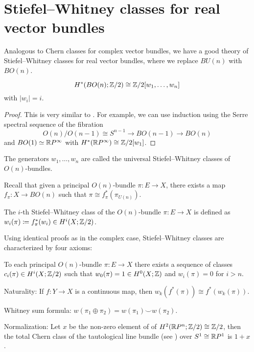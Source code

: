 \documentclass[ma3408.tex]{subfiles}
\begin{document}
\section{Stiefel--Whitney classes for real vector bundles}
Analogous to Chern classes for complex vector bundles, we have a good theory of Stiefel--Whitney classes for real vector bundles, where we replace $BU(n)$ with $BO(n)$. 
\begin{Prop}\label{prop:cohomology-of-bon}
\[
H^*(BO(n);\mathbb{Z}/2) \cong \mathbb{Z}/2[w_1,\ldots,w_n]
\]
with $|w_i| = i$. 
\end{Prop}
\begin{proof}
This is very similar to . For example, we can use induction using the Serre spectral sequence of the fibration
\[
O(n)/O(n-1) \cong S^{n-1} \to BO(n-1) \to BO(n)
\]
and $BO(1) \simeq \mathbb{R} P^{\infty}$ with $H^*(\mathbb{R} P^{\infty}) \cong \mathbb{Z}/2[w_1]$. 
\end{proof}
\begin{Def}
The generators $w_1,\ldots,w_n$ are called the universal Stiefel--Whitney classes of $O(n)$-bundles. 
\end{Def}
\begin{Rem}
Recall that given a principal $O(n)$-bundle $\pi \colon E \to X$, there exists a map $f_{\pi} \colon X \to BO(n)$ such that $\pi \cong f^*_{\pi}(\pi_{U(n)})$. 
\end{Rem}
\begin{Def}
The $i$-th Stiefel--Whitney class of the $O(n)$-bundle $\pi \colon E \to X$ is defined as $w_i(\pi) \coloneqq f_{\pi}^*(w_i) \in H^{i}(X;\mathbb{Z}/2)$. 
\end{Def}
Using identical proofs as in the complex case, Stiefel--Whitney classes are characterized by four axioms:
\begin{axioms}
    \item To each principal $O(n)$-bundle $\pi \colon E \to X$ there exists a sequence of classes $c_i(\pi) \in H^{i}(X;\mathbb{Z}/2)$ such that $w_0(\pi) = 1 \in H^0(X;\mathbb{Z})$ and $w_i(\pi) = 0$ for $i> n$. \label{a1-sw}
    \item Naturality: If $f \colon Y \to X$ is a continuous map, then $w_k(f^*(\pi)) \cong f^*(w_k(\pi))$.  \label{a2-sw}
    \item Whitney sum formula: $w(\pi_1\oplus\pi_2) = w(\pi_1) \smile w(\pi_2)$.  \label{a3-sw}
    \item Normalization: Let $x$ be the non-zero element of of $H^2(\mathbb{R} P^n;\mathbb{Z}/2) \cong \mathbb{Z}/2$, then the total Chern class of the tautological line bundle (see ) over $S^1 \cong \mathbb{R} P^1$ is $1+x$.\label{a4-sw}
    \end{axioms}
\end{document}
